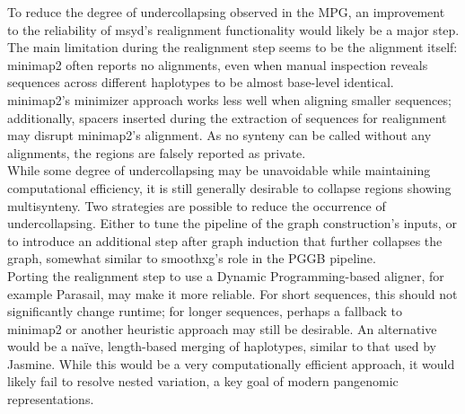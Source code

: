 To reduce the degree of undercollapsing observed in the MPG, an improvement to the reliability of msyd's realignment functionality would likely be a major step.
The main limitation during the realignment step seems to be the alignment itself: minimap2 often reports no alignments, even when manual inspection reveals sequences across different haplotypes to be almost base-level identical.
minimap2's minimizer approach works less well when aligning smaller sequences; additionally, spacers inserted during the extraction of sequences for realignment may disrupt minimap2's alignment\cite{minimapns}.
As no synteny can be called without any alignments, the regions are falsely reported as private.\\
While some degree of undercollapsing may be unavoidable while maintaining computational efficiency, it is still generally desirable to collapse regions showing multisynteny.
Two strategies are possible to reduce the occurrence of undercollapsing.
Either to tune the pipeline of the graph construction's inputs, or to introduce an additional step after graph induction that further collapses the graph, somewhat similar to smoothxg's role in the PGGB pipeline\cite{garrison22}.\\
Porting the realignment step to use a Dynamic Programming-based aligner, for example Parasail, may make it more reliable\cite{daily16}.
For short sequences, this should not significantly change runtime; for longer sequences, perhaps a fallback to minimap2 or another heuristic approach may still be desirable.
An alternative would be a naïve, length-based merging of haplotypes, similar to that used by Jasmine\cite{jasmine}. 
While this would be a very computationally efficient approach, it would likely fail to resolve nested variation, a key goal of modern pangenomic representations.\\
